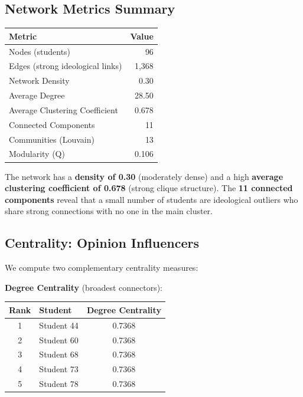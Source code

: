 \documentclass[11pt]{article}
\begin{document}
\subsection{Network Metrics Summary}
\begin{center}
\begin{tabular}{@{}lr@{}}
\toprule
\textbf{Metric} & \textbf{Value} \\ \midrule
Nodes (students) & 96 \\
Edges (strong ideological links) & 1,368 \\
Network Density & 0.30 \\
Average Degree & 28.50 \\
Average Clustering Coefficient & 0.678 \\
Connected Components & 11 \\
Communities (Louvain) & 13 \\
Modularity (Q) & 0.106 \\ \bottomrule
\end{tabular}
\end{center}

The network has a \textbf{density of 0.30} (moderately dense) and a high \textbf{average clustering coefficient of 0.678} (strong clique structure). The \textbf{11 connected components} reveal that a small number of students are ideological outliers who share strong connections with no one in the main cluster.

\subsection{Centrality: Opinion Influencers}
We compute two complementary centrality measures:

\textbf{Degree Centrality} (broadest connectors):
\begin{center}
\begin{tabular}{@{}clc@{}}
\toprule
\textbf{Rank} & \textbf{Student} & \textbf{Degree Centrality} \\ \midrule
1 & Student 44 & 0.7368 \\
2 & Student 60 & 0.7368 \\
3 & Student 68 & 0.7368 \\
4 & Student 73 & 0.7368 \\
5 & Student 78 & 0.7368 \\ \bottomrule
\end{tabular}
\end{center}
\end{document}
